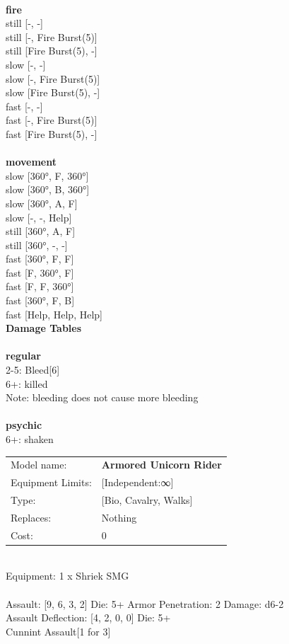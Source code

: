 \ \\ {\bf fire } \\
still [-, -] \\
still [-, Fire Burst(5)] \\
still [Fire Burst(5), -] \\
slow [-, -] \\
slow [-, Fire Burst(5)] \\
slow [Fire Burst(5), -] \\
fast [-, -] \\
fast [-, Fire Burst(5)] \\
fast [Fire Burst(5), -] \\
\ \\ {\bf movement } \\
slow [360°, F, 360°] \\
slow [360°, B, 360°] \\
slow [360°, A, F] \\
slow [-, -, Help] \\
still [360°, A, F] \\
still [360°, -, -] \\
fast [360°, F, F] \\
fast [F, 360°, F] \\
fast [F, F, 360°] \\
fast [360°, F, B] \\
fast [Help, Help, Help] \\


{\bf Damage Tables} \\
\ \\ {\bf regular } \\
2-5: Bleed[6] \\
6+: killed \\
Note: bleeding does not cause more bleeding \\
\ \\ {\bf psychic } \\
6+: shaken \\


\noindent
\begin{tabular}{ll}
Model name: &{\bf Armored Unicorn Rider } \\
Equipment Limits: &[Independent:∞] \\
Type: &[Bio, Cavalry, Walks] \\
Replaces: &Nothing \\
Cost: & 0\\
\end{tabular}
\ \\
Equipment: 1 x Shriek SMG \\
\ \\
Assault: [9, 6, 3, 2] Die: 5+ Armor Penetration: 2 Damage: d6-2 \\
Assault Deflection: [4, 2, 0, 0] Die: 5+\\
\indent Cunnint Assault[1 for 3]\\ 
 
